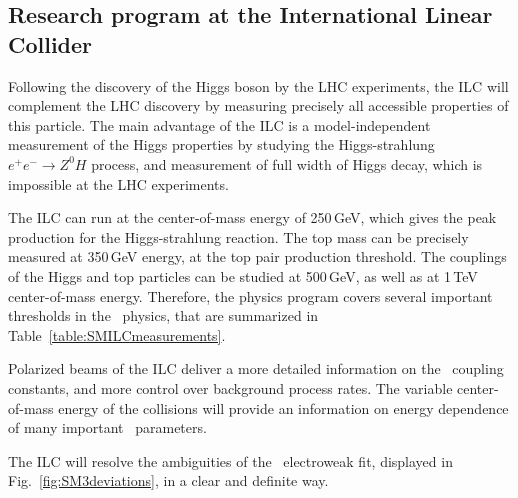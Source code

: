 

\subsection{Research program at the International Linear Collider}

Following the discovery of the Higgs boson by the LHC experiments, the ILC will complement the LHC discovery by measuring precisely all accessible properties of this particle.
The main advantage of the ILC is a model-independent measurement of the Higgs properties by studying  the Higgs-strahlung $e^+e^-\to Z^0H$ process, and measurement of full width of Higgs decay, which is impossible at the LHC experiments. 



The ILC can run at the center-of-mass energy of 250\,GeV, which gives the peak production for the  Higgs-strahlung reaction. 
The top mass can be precisely measured at 350\,GeV energy, at the top pair production threshold. 
The couplings of the Higgs and top particles can be studied at 500\,GeV, as well as at 1\,TeV center-of-mass energy.
Therefore, the physics program covers several important thresholds in the \sm\ physics, that are summarized in Table~\ref{table:SMILCmeasurements}. 



Polarized beams of the ILC deliver a more detailed information on the \sm\ coupling constants, and more control over background process rates. 
The variable center-of-mass energy of the collisions will provide an information on energy dependence of many important \sm\ parameters. 
 
The ILC will resolve the ambiguities of the \sm\ electroweak fit, displayed in Fig.~\ref{fig:SM3deviations}, in a clear and definite way. 

